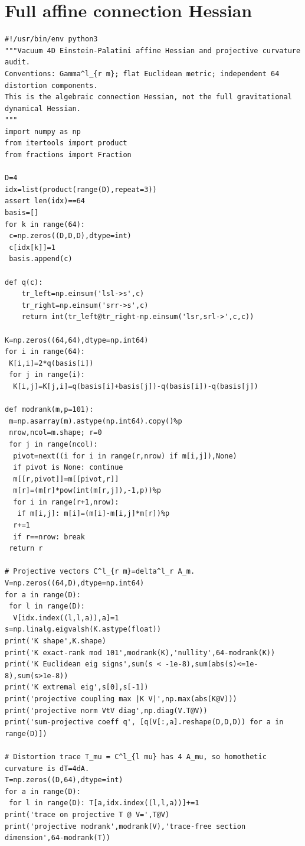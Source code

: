 \documentclass[11pt,oneside]{report}
\begin{document}
\section{Full affine connection Hessian}
\noindent{}\par
\begin{Verbatim}[breaklines=true,breakanywhere=true,fontsize=\scriptsize]
#!/usr/bin/env python3
"""Vacuum 4D Einstein-Palatini affine Hessian and projective curvature audit.
Conventions: Gamma^l_{r m}; flat Euclidean metric; independent 64 distortion components.
This is the algebraic connection Hessian, not the full gravitational dynamical Hessian.
"""
import numpy as np
from itertools import product
from fractions import Fraction

D=4
idx=list(product(range(D),repeat=3))
assert len(idx)==64
basis=[]
for k in range(64):
 c=np.zeros((D,D,D),dtype=int)
 c[idx[k]]=1
 basis.append(c)

def q(c):
    tr_left=np.einsum('lsl->s',c)
    tr_right=np.einsum('srr->s',c)
    return int(tr_left@tr_right-np.einsum('lsr,srl->',c,c))

K=np.zeros((64,64),dtype=np.int64)
for i in range(64):
 K[i,i]=2*q(basis[i])
 for j in range(i):
  K[i,j]=K[j,i]=q(basis[i]+basis[j])-q(basis[i])-q(basis[j])

def modrank(m,p=101):
 m=np.asarray(m).astype(np.int64).copy()%p
 nrow,ncol=m.shape; r=0
 for j in range(ncol):
  pivot=next((i for i in range(r,nrow) if m[i,j]),None)
  if pivot is None: continue
  m[[r,pivot]]=m[[pivot,r]]
  m[r]=(m[r]*pow(int(m[r,j]),-1,p))%p
  for i in range(r+1,nrow):
   if m[i,j]: m[i]=(m[i]-m[i,j]*m[r])%p
  r+=1
  if r==nrow: break
 return r

# Projective vectors C^l_{r m}=delta^l_r A_m.
V=np.zeros((64,D),dtype=np.int64)
for a in range(D):
 for l in range(D):
  V[idx.index((l,l,a)),a]=1
s=np.linalg.eigvalsh(K.astype(float))
print('K shape',K.shape)
print('K exact-rank mod 101',modrank(K),'nullity',64-modrank(K))
print('K Euclidean eig signs',sum(s < -1e-8),sum(abs(s)<=1e-8),sum(s>1e-8))
print('K extremal eig',s[0],s[-1])
print('projective coupling max |K V|',np.max(abs(K@V)))
print('projective norm VtV diag',np.diag(V.T@V))
print('sum-projective coeff q', [q(V[:,a].reshape(D,D,D)) for a in range(D)])

# Distortion trace T_mu = C^l_{l mu} has 4 A_mu, so homothetic curvature is dT=4dA.
T=np.zeros((D,64),dtype=int)
for a in range(D):
 for l in range(D): T[a,idx.index((l,l,a))]+=1
print('trace on projective T @ V=',T@V)
print('projective modrank',modrank(V),'trace-free section dimension',64-modrank(T))


\end{Verbatim}
\end{document}
